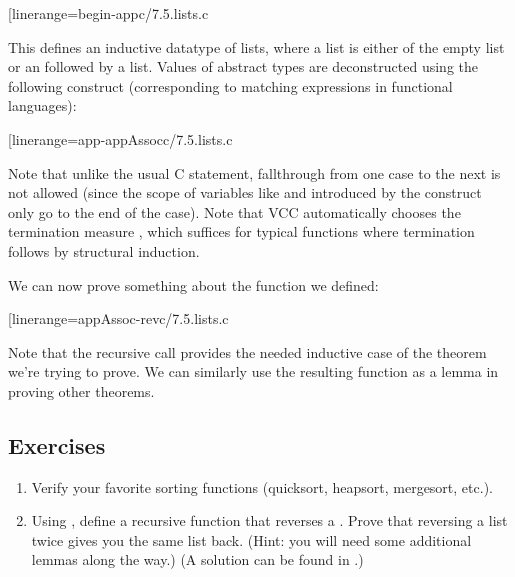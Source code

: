 \vccInput[linerange={begin-app}{c/7.5.lists.c}

This defines an inductive datatype of lists, where a list is either of
the empty list  or an  followed by a
list. Values of abstract types are deconstructed using the following
 construct (corresponding to matching expressions in
functional languages):

\vccInput[linerange={app-appAssoc}{c/7.5.lists.c}

Note that unlike the usual C  statement, fallthrough from
one case to the next is not allowed (since the scope of variables like
 and  introduced by the  construct only go to
the end of the case). Note that VCC automatically chooses the
termination measure , which
suffices for typical functions where termination follows by structural
induction. 

We can now prove something about the function we defined:

\vccInput[linerange={appAssoc-rev}{c/7.5.lists.c}

Note that the recursive call provides the needed inductive case of the
theorem we're trying to prove. We can similarly use the resulting
function as a lemma in proving other theorems. 


\subsection*{Exercises}
\begin{enumerate}

\item 
Verify your favorite sorting functions (quicksort, heapsort,
mergesort, etc.).
\item
Using , define a recursive function that reverses a
. Prove that reversing a list twice gives you the same list
back. (Hint: you will need some additional lemmas along the way.) (A
solution can be found in .)
\end{enumerate}
